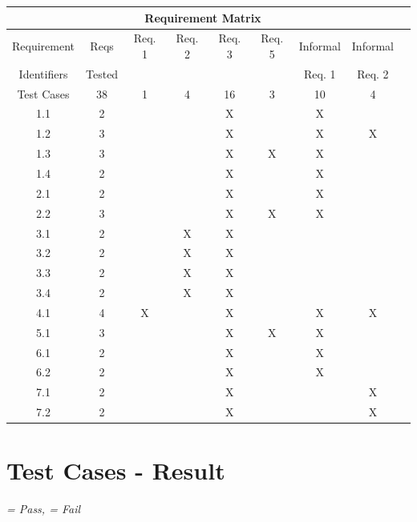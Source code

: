 \documentclass[a4paper, 12pt]{article}
\newcommand{\cmark}{\ding{51}}%
\newcommand{\xmark}{\ding{55}}%
\begin{document}
\begin{tabular}{|c|c|c|c|c|c|c|c|c|}
\hline
\multicolumn{8}{|c|}{Requirement Matrix} \\ \hline
Requirement	& Reqs		& Req. 1	& 	Req. 2	&  Req. 3	& Req. 5 	& Informal	& Informal	\\ 
Identifiers		& Tested	&				&				& 				&				&	Req. 1	&	Req. 2	\\ \hline
Test Cases	&	38			&	1			&	4			&	16			&	3			&	10			&	4			\\ \hline
1.1				& 	2			&				&				&	X			&				&	X			&				\\ \hline
1.2				& 	3			&				&				&	X			&				&	X			& X			\\ \hline
1.3 				& 	3			&				&				&	X			& X			&	X			&				\\ \hline
1.4				&	2			&				&				&  X			&				&	X			&				\\ \hline
2.1				&	2			& 				& 				&	X			&				&	X			&				\\ \hline
2.2				&	3			&				& 				&	X			& X			&	X			&				\\ \hline
3.1				&	2			&				& X			&	X			&				&				&				\\ \hline
3.2				&	2			&				& X			&	X			&				&				&				\\ \hline
3.3				&	2			&				& X			&	X			&				&				&				\\ \hline
3.4				&	2			&				& X			&	X			&				&				&				\\ \hline
4.1				& 	4			&	X			& 				&	X			& 				& X			& X			\\ \hline
5.1				&	3			&				&				&	X			& X			& X			&				\\ \hline
6.1				&	2			&				&				&	X			&				& X			&				\\ \hline
6.2				&	2			&				&				&	X			&				& X			&				\\ \hline
7.1				&	2			&				&				&	X			&				&				& X			\\ \hline
7.2				&	2			&				&				&  X			&				&				& X			\\ \hline

\end{tabular}

\newpage
\section{Test Cases - Result}

\textit{\cmark = Pass, \xmark = Fail} \\
\end{document}
